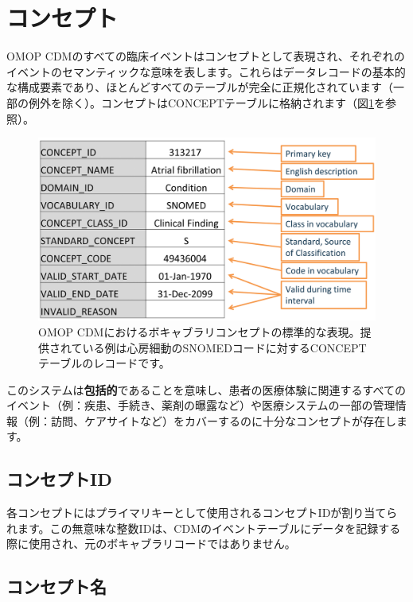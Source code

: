 \documentclass[
  11pt]{book}
\theoremstyle{definition}
\theoremstyle{definition}
\theoremstyle{definition}
\theoremstyle{definition}
\theoremstyle{remark}
\begin{document}
\section{コンセプト}\label{ux30b3ux30f3ux30bbux30d7ux30c8}

OMOP CDMのすべての臨床イベントはコンセプトとして表現され、それぞれのイベントのセマンティックな意味を表します。これらはデータレコードの基本的な構成要素であり、ほとんどすべてのテーブルが完全に正規化されています（一部の例外を除く）。コンセプトはCONCEPTテーブルに格納されます（図\ref{fig:concept}を参照）。

\begin{figure}

{\centering \includegraphics[width=0.9\linewidth]{images/StandardizedVocabularies/concept} 

}

\caption{OMOP CDMにおけるボキャブラリコンセプトの標準的な表現。提供されている例は心房細動のSNOMEDコードに対するCONCEPTテーブルのレコードです。}\label{fig:concept}
\end{figure}

このシステムは\textbf{包括的}であることを意味し、患者の医療体験に関連するすべてのイベント（例：疾患、手続き、薬剤の曝露など）や医療システムの一部の管理情報（例：訪問、ケアサイトなど）をカバーするのに十分なコンセプトが存在します。

\subsection{コンセプトID}\label{ux30b3ux30f3ux30bbux30d7ux30c8id}

各コンセプトにはプライマリキーとして使用されるコンセプトIDが割り当てられます。この無意味な整数IDは、CDMのイベントテーブルにデータを記録する際に使用され、元のボキャブラリコードではありません。 

\subsection{コンセプト名}\label{ux30b3ux30f3ux30bbux30d7ux30c8ux540d}
\end{document}
